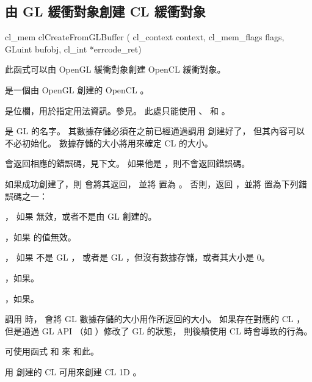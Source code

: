 \subsection{由 GL 緩衝對象創建 CL 緩衝對象}


\startCLFUNC
cl_mem clCreateFromGLBuffer (
			cl_context context,
			cl_mem_flags flags,
			GLuint bufobj,
			cl_int *errcode_ret)
\stopCLFUNC

此函式可以由 OpenGL 緩衝對象創建 OpenCL 緩衝對象。

 是一個由 OpenGL 創建的 OpenCL 。

 是位欄，用於指定用法資訊。參見。
此處只能使用 、  和 。

 是 GL 的名字。
其數據存儲必須在之前已經通過調用  創建好了，
但其內容可以不必初始化。
數據存儲的大小將用來確定 CL 的大小。

 會返回相應的錯誤碼，見下文。
如果他是 ，則不會返回錯誤碼。

如果成功創建了，則  會將其返回，
並將  置為 。
否則，返回 ，並將  置為下列錯誤碼之一：
\startigBase
\item {}，
如果  無效，或者不是由 GL 創建的。

\item {}，如果  的值無效。

\item {}，
如果  不是 GL ，
或者是 GL ，但沒有數據存儲，或者其大小是 0。

\item {}，如果\scdevfailres。

\item {}，如果\schostfailres。
\stopigBase

調用  時，
會將 GL 數據存儲的大小用作所返回的大小。
如果存在對應的 CL ，
但是通過 GL API （如 ）修改了 GL 的狀態，
則後續使用 CL 時會導致的行為。

可使用函式  和  來
和此。

用  創建的 CL 可用來創建 CL 1D 。

